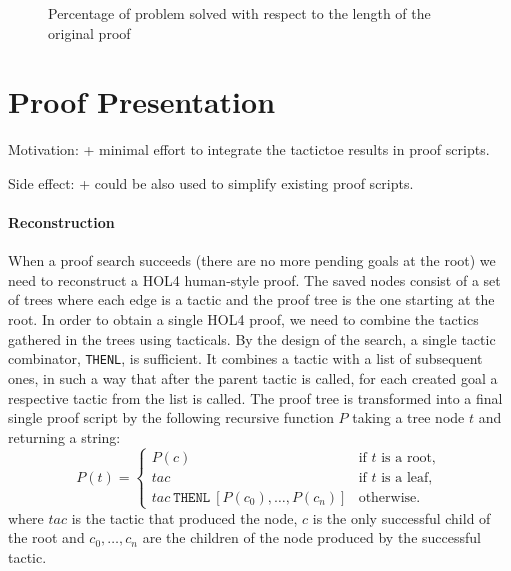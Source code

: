 \documentclass[runningheads,a4paper,draft]{svjour3}
\def\holfour{\textsf{HOL4}\xspace}
\def\eprover{\textsf{E-prover}\xspace}
\def\tactictoe{\textsf{TacticToe}\xspace}
\begin{document}
\begin{figure}[h]
\centering           
{}
\caption{Percentage of problem solved with respect to the length of the 
original 
proof}
\end{figure}


% 

\section{Proof Presentation}\label{sec:proofdisplay}

Motivation: 
+ minimal effort to integrate the tactictoe results in proof scripts.

Side effect:
+ could be also used to simplify existing proof scripts. 

\paragraph{Reconstruction}
When a proof search succeeds (there are no more pending goals at the root)
we need to reconstruct a \holfour human-style proof.
The saved nodes consist of a set of trees where each edge is a tactic and
the proof tree is the one starting at the root.
In order to obtain a single \holfour proof, we need to combine the tactics
gathered in the trees using tacticals.
By the design of the search, a single tactic combinator, \texttt{THENL}, is 
sufficient. It combines a tactic with a list of subsequent ones, in such a way 
that after the parent tactic is called, for each created goal a respective 
tactic from the list is called.
The proof tree is transformed into a final single proof script
 by the following recursive function $P$ taking a
tree node $t$ and returning a string:
\begin{equation*}
P(t) =
\begin{cases}
P(c) & \text{if $t$ is a root},\\
tac & \text{if $t$ is a leaf},\\
tac\ \texttt{THENL}\ [P(c_0),\ldots,P(c_n)] & \text{otherwise.}
\end{cases}
\end{equation*}
where $tac$ is the tactic that produced the node, $c$ is the
only successful child of the root and $c_0, \ldots, c_n$ are the 
children of the node produced by the successful tactic.
\end{document}
